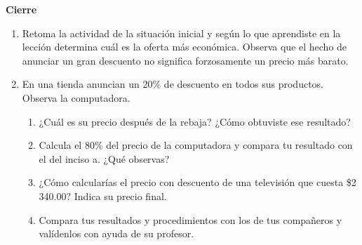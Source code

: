\documentclass[11pt]{book}
\begin{document}
\begin{boxK}
  \begin{center}\textbf{Cierre}\end{center}

  \begin{enumerate}
    \item Retoma la actividad de la situación inicial y según lo que aprendiste en la lección
          determina cuál es la oferta más económica. Observa que el hecho de
          anunciar un gran descuento no significa forzosamente un precio más barato.
    \item En una tienda anuncian un 20\% de descuento en todos sus productos. Observa
          la computadora.
          \begin{enumerate}
            \item ¿Cuál es su precio después de la rebaja? ¿Cómo obtuviste ese resultado?
            \item Calcula el 80\% del precio de la computadora y compara tu resultado con el del inciso a. ¿Qué observas?
            \item ¿Cómo calcularías el precio con descuento de una televisión que cuesta \$2 340.00? Indica su precio final.
            \item Compara tus resultados y procedimientos con los de tus compañeros y valídenlos con ayuda de su profesor.
          \end{enumerate}
  \end{enumerate}
\end{boxK}
\newpage
\end{document}
